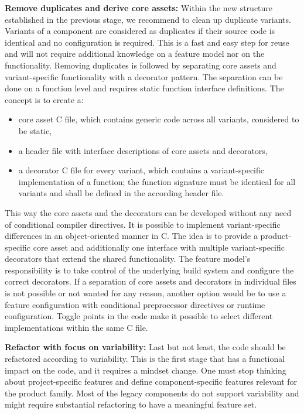 \textbf{Remove duplicates and derive core assets:} Within the new structure
established in the previous stage, we recommend to clean up duplicate variants.
Variants of a component are considered as duplicates if their source code is
identical and no configuration is required. This is a fast and easy step for
reuse and will not require additional knowledge on a feature model nor on the
functionality. Removing duplicates is followed by separating core assets and
variant-specific functionality with a decorator pattern. The separation can be
done on a function level and requires static function interface definitions. The
concept is to create a:
\begin{itemize}
  \item core asset C file, which contains generic code across all variants,
        considered to be static,
  \item a header file with interface descriptions of core assets and decorators,
  \item a decorator C file for every variant, which contains a variant-specific
        implementation of a function; the function signature must be identical
        for all variants and shall be defined in the according header file.
\end{itemize}
This way the core assets and the decorators can be developed without any need of
conditional compiler directives. It is possible to implement variant-specific
differences in an object-oriented manner in C. The idea is to provide a
product-specific core asset and additionally one interface with multiple
variant-specific decorators that extend the shared functionality. The feature
model's responsibility is to take control of the underlying build system and
configure the correct decorators. If a separation of core assets and
decorators in individual files is not possible or not wanted for any reason,
another option would be to use a feature configuration with conditional
preprocessor directives or runtime configuration. Toggle points in the code make
it possible to select different implementations within the same C file.

\textbf{Refactor with focus on variability:} Last but not least, the code should
be refactored according to variability. This is the first stage that has a
functional impact on the code, and it requires a mindset change. One must stop
thinking about project-specific features and define component-specific features
relevant for the product family. Most of the legacy components do not support
variability and might require substantial refactoring to have a meaningful
feature set.

